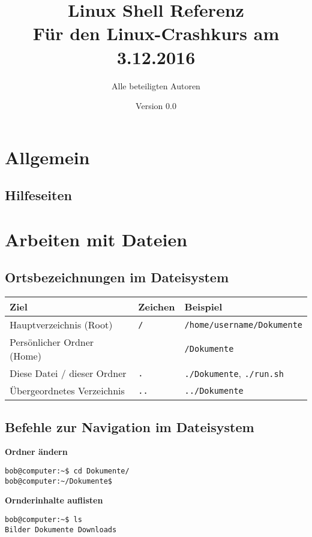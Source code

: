 \documentclass[11pt]{article}
\title{\textbf{Linux Shell Referenz}\\Für den Linux-Crashkurs am 3.12.2016}
\author{Alle beteiligten Autoren}
\date{Version 0.0}
\newcommand{\textapprox}{\raisebox{0.5ex}{\texttildelow}}
\begin{document}
\maketitle

\section {Allgemein}

\subsection {Hilfeseiten}

\section {Arbeiten mit Dateien}

\subsection {Ortsbezeichnungen im Dateisystem}

\begin{tabularx}{1\textwidth}{|l|l|X|}
\hline
\textbf{Ziel} & \textbf{Zeichen} & \textbf{Beispiel} \\
\hline
Hauptverzeichnis (Root) & \lstinline$/$ & \lstinline$/home/username/Dokumente$ \\
Persönlicher Ordner (Home) & \textapprox & \textapprox\lstinline$/Dokumente$ \\
Diese Datei / dieser Ordner & \lstinline$.$ & \lstinline$./Dokumente$, \lstinline$./run.sh$ \\
Übergeordnetes Verzeichnis & \lstinline$..$ & \lstinline$../Dokumente$ \\
\hline
\end{tabularx}

\subsection {Befehle zur Navigation im Dateisystem}

\textbf{Ordner ändern}

\begin{lstlisting}[style=terminal]
bob@computer:~$ cd Dokumente/
bob@computer:~/Dokumente$ 
\end{lstlisting}

\textbf{Ornderinhalte auflisten}

\begin{lstlisting}[style=terminal]
bob@computer:~$ ls
Bilder Dokumente Downloads
\end{lstlisting}
\end{document}
